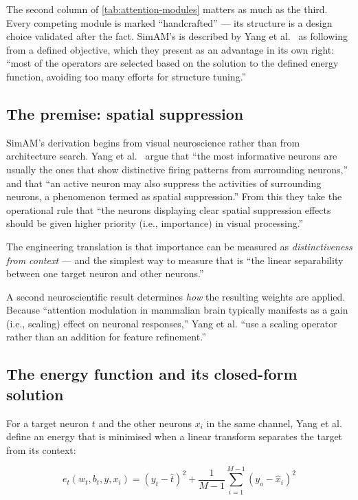 The second column of \autoref{tab:attention-modules} matters as much as the third. Every competing module is marked ``handcrafted'' --- its structure is a design choice validated after the fact. SimAM's is described by Yang et al.~\cite{yang2021} as following from a defined objective, which they present as an advantage in its own right: ``most of the operators are selected based on the solution to the defined energy function, avoiding too many efforts for structure tuning.''

\subsection{The premise: spatial suppression}
\label{sec:simam-premise}

SimAM's derivation begins from visual neuroscience rather than from architecture search. Yang et al.~\cite{yang2021} argue that ``the most informative neurons are usually the ones that show distinctive firing patterns from surrounding neurons,'' and that ``an active neuron may also suppress the activities of surrounding neurons, a phenomenon termed as spatial suppression.'' From this they take the operational rule that ``the neurons displaying clear spatial suppression effects should be given higher priority (i.e., importance) in visual processing.''

The engineering translation is that importance can be measured as \textit{distinctiveness from context} --- and the simplest way to measure that is ``the linear separability between one target neuron and other neurons.''

A second neuroscientific result determines \textit{how} the resulting weights are applied. Because ``attention modulation in mammalian brain typically manifests as a gain (i.e., scaling) effect on neuronal responses,'' Yang et al. ``use a scaling operator rather than an addition for feature refinement.''

\subsection{The energy function and its closed-form solution}
\label{sec:simam-energy}

For a target neuron $t$ and the other neurons $x_i$ in the same channel, Yang et al.~\cite{yang2021} define an energy that is minimised when a linear transform separates the target from its context:

\[
	e_t(w_t, b_t, y, x_i) = (y_t - \hat{t})^2 + \frac{1}{M-1}\sum_{i=1}^{M-1}(y_o - \hat{x}_i)^2
\]

